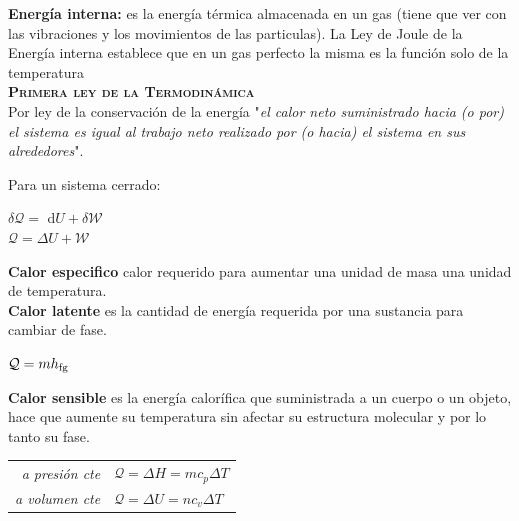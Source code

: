 \documentclass[11pt,a4paper,twocolumn]{article}
\begin{document}
	\textbf{Energía interna:} es la energía térmica almacenada en un gas (tiene que ver con las vibraciones y los movimientos de las particulas). La Ley de Joule de la Energía interna establece que en un gas perfecto la misma es la función solo de la temperatura\\
	
	\textbf{\textsc{Primera ley de la Termodinámica}}\\

Por ley de la conservación de la energía "\textsl{el calor neto suministrado hacia (o por) el sistema es igual al trabajo neto realizado por (o hacia) el sistema en sus alrededores}".
	
Para un sistema cerrado:
\begin{center}
	$\delta \mathcal{Q}=$ d$U +\delta \mathcal{W}$\\
	$\mathcal{Q}= \Delta U + \mathcal{W}$\\
\end{center}

	\textbf{Calor especifico} calor requerido para aumentar una unidad de masa una unidad de temperatura.\\
	
	\textbf{Calor latente}  es la cantidad de energía requerida por una sustancia para cambiar de fase.
	\begin{center}
		$\mathcal{Q}=m h_\textup{fg}$ 
	\end{center} 
	
	\textbf{Calor sensible} es la energía calorífica que suministrada a un cuerpo o un objeto, hace que aumente su temperatura sin afectar su estructura molecular y por lo tanto su fase.
	\begin{center}
		\begin{tabular}{r | l}
			\textsl{a presión cte } & $\mathcal{Q}=\Delta H= m c_{p}\Delta T$ \\ \vspace{.2cm}
			\textsl{a volumen cte } & $\mathcal{Q}=\Delta U = n c_{v}\Delta T$
		\end{tabular}
	\end{center}
\end{document}

